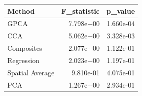 \begin{tabular}{lrr}
\toprule
Method & F_statistic & p_value \\
\midrule
GPCA & 7.798e+00 & 1.660e-04 \\
CCA & 5.062e+00 & 3.328e-03 \\
Composites & 2.077e+00 & 1.122e-01 \\
Regression & 2.023e+00 & 1.197e-01 \\
Spatial Average & 9.810e-01 & 4.075e-01 \\
PCA & 1.267e+00 & 2.934e-01 \\
\bottomrule
\end{tabular}
